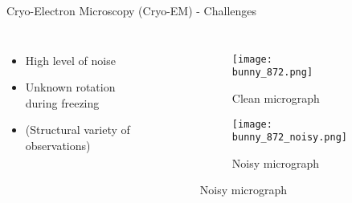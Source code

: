 \begin{frame}[c]{Cryo-Electron Microscopy (Cryo-EM) - Challenges}
    \begin{columns}[c]
        
        \begin{itemize}
            \item High level of noise
            \item Unknown rotation during freezing
            \item (Structural variety of observations)
        \end{itemize}

        \begin{figure}
            \centering
            \begin{subfigure}[t]{0.5\textwidth}
                \texttt{[image: bunny\_872.png]}
                \caption{Clean micrograph}
            \end{subfigure}\hfill                
            \begin{subfigure}[t]{0.5\textwidth}
                \texttt{[image: bunny\_872\_noisy.png]}
                \caption{Noisy micrograph}
            \end{subfigure}\hfill                
        \end{figure}

    \end{columns}

\end{frame}

